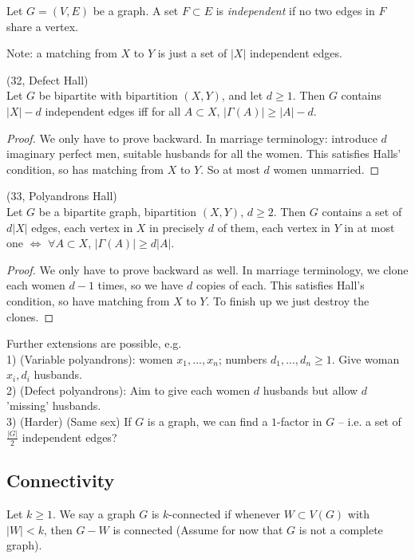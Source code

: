 \documentclass[a4paper]{article}
\begin{document}
\begin{defi}
Let $G=(V,E)$ be a graph. A set $F \subset E$ is \emph{independent} if no two edges in $F$ share a vertex.

Note: a matching from $X$ to $Y$ is just a set of $|X|$ independent edges.
\end{defi}

\begin{coro} (32, Defect Hall)\\
Let $G$ be bipartite with bipartition $(X,Y)$, and let $d \geq 1$. Then $G$ contains $|X|-d$ independent edges iff for all $A \subset X$, $|\Gamma(A)| \geq |A|-d$.
\begin{proof}
We only have to prove backward. In marriage terminology: introduce $d$ imaginary perfect men, suitable husbands for all the women. This satisfies Halls' condition, so has matching from $X$ to $Y$. So at most $d$ women unmarried.
\end{proof}
\end{coro}

\begin{coro} (33, Polyandrons Hall)\\
Let $G$ be a bipartite graph, bipartition $(X,Y)$, $d \geq 2$. Then $G$ contains a set of $d|X|$ edges, each vertex in $X$ in precisely $d$ of them, each vertex in $Y$ in at most one $\iff$ $\forall A \subset X$, $|\Gamma(A)| \geq d|A|$.
\begin{proof}
We only have to prove backward as well. In marriage terminology, we clone each women $d-1$ times, so we have $d$ copies of each. This satisfies Hall's condition, so have matching from $X$ to $Y$. To finish up we just destroy the clones.
\end{proof}
\end{coro}

Further extensions are possible, e.g.\\
1) (Variable polyandrons): women $x_1,...,x_n$; numbers $d_1,...,d_n \geq 1$. Give woman $x_i,d_i$ husbands.\\
2) (Defect polyandrons): Aim to give each women $d$ husbands but allow $d$ 'missing' husbands.\\
3) (Harder) (Same sex) If $G$ is a graph, we can find a $1$-factor in $G$ -- i.e. a set of $\frac{|G|}{2}$ independent edges?

\subsection{Connectivity}
Let $k \geq 1$. We say a graph $G$ is $k$-connected if whenever $W \subset V(G)$ with $|W| < k$, then $G-W$ is connected (Assume for now that $G$ is not a complete graph).
\end{document}
